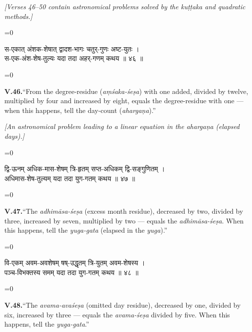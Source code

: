 \documentclass[11pt,a4paper]{article}
\newcommand{\cnote}[1]{\textcolor{notecolor}{\textit{#1}}}
\newcommand{\dev}[1]{{\devanagarifont\color{sktcolor}#1}}
\newcommand{\iast}[1]{\textit{#1}}
\newenvironment{paracol}[1]{\begingroup}{\endgroup}
\newcommand{\switchcolumn}[1][]{%
  \ifnum#1=0\relax\else\par\nobreak\vspace{0.5em}\par\nobreak\fi%
}
\begin{document}
\vspace{0.5cm}
\cnote{[Verses 46–50 contain astronomical problems solved by the
\iast{kuṭṭaka} and quadratic methods.]}
\vspace{0.5cm}

\begin{paracol}{2}
\switchcolumn[0]
\dev{%
स-एकात् अंशक-शेषात् द्वादश-भागः चतुर्-गुणः अष्ट-युतः ।\\
स-एक-अंश-शेष-तुल्यः यदा तदा अहर्-गणम् कथय ॥ ४६ ॥
}

\switchcolumn[1]
\textbf{V.46.}\quad ``From the degree-residue (\iast{aṃśaka-śeṣa})
with one added, divided by twelve, multiplied by four and increased
by eight, equals the degree-residue with one — when this happens,
tell the day-count (\iast{ahargaṇa}).''

\medskip
\textit{[An astronomical problem leading to a linear equation in
the \iast{ahargaṇa} (elapsed days).]}
\end{paracol}

\vspace{0.3cm}

\begin{paracol}{2}
\switchcolumn[0]
\dev{%
द्वि-ऊनम् अधिक-मास-शेषम् त्रि-हृतम् सप्त-अधिकम् द्वि-सङ्गुणितम् ।\\
अधिमास-शेष-तुल्यम् यदा तदा युग-गतम् कथय ॥ ४७ ॥
}

\switchcolumn[1]
\textbf{V.47.}\quad ``The \iast{adhimāsa-śeṣa} (excess month residue),
decreased by two, divided by three, increased by seven, multiplied
by two — equals the \iast{adhimāsa-śeṣa}. When this happens, tell
the \iast{yuga-gata} (elapsed in the \iast{yuga}).''
\end{paracol}

\vspace{0.3cm}

\begin{paracol}{2}
\switchcolumn[0]
\dev{%
वि-एकम् अवम-अवशेषम् षष्-उद्धृतम् त्रि-युतम् अवम-शेषस्य ।\\
पञ्च-विभक्तस्य समम् यदा तदा युग-गतम् कथय ॥ ४८ ॥
}

\switchcolumn[1]
\textbf{V.48.}\quad ``The \iast{avama-avaśeṣa} (omitted day residue),
decreased by one, divided by six, increased by three — equals the
\iast{avama-śeṣa} divided by five. When this happens, tell the
\iast{yuga-gata}.''
\end{paracol}

\newpage

\end{document}
